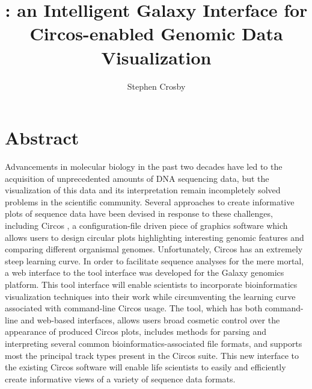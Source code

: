 \documentclass[twocolumn]{article}
\title{\projectName: an Intelligent Galaxy Interface for Circos-enabled Genomic Data Visualization}
\author{Stephen Crosby}
\begin{document}
\maketitle
\section*{Abstract}
Advancements in molecular biology in the past two decades have led to the acquisition of
unprecedented amounts of DNA sequencing data, but the visualization of this data and its
interpretation remain incompletely solved problems in the scientific community. Several approaches to
create informative plots of sequence data have been devised in response to these challenges,
including Circos \cite{circospaper}, a configuration-file driven piece of graphics software which allows users to design circular plots highlighting
interesting genomic features and comparing different organismal genomes. Unfortunately, Circos has an extremely steep learning curve.
In order to facilitate sequence analyses for the mere mortal, a web interface to the tool interface was developed for the Galaxy \cite{galaxypaper} genomics platform.
This tool interface will enable scientists to incorporate bioinformatics visualization techniques into their work while circumventing the learning curve associated with command-line Circos usage. The tool, which has both command-line and web-based interfaces, allows users broad cosmetic control over the appearance of produced Circos plots, includes methods for parsing and interpreting several common bioinformatics-associated file formats, and supports most the principal track types present in the Circos suite. This new interface to the existing Circos software will enable life scientists to easily and efficiently create informative views of a variety of sequence data formats.
\end{document}
